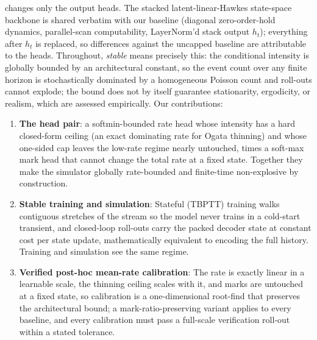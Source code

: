 \ssppp{} changes only the output heads. The stacked latent-linear-Hawkes
state-space backbone is shared verbatim with our \spppu{} baseline
(diagonal zero-order-hold dynamics, parallel-scan computability, LayerNorm'd
stack output $h_t$); everything after $h_t$ is replaced, so differences
against the uncapped baseline are attributable to the heads. Throughout,
\emph{stable} means precisely this: the conditional intensity is globally
bounded by an architectural constant, so the event count over any finite
horizon is stochastically dominated by a homogeneous Poisson count and
roll-outs cannot explode; the bound does not by itself guarantee
stationarity, ergodicity, or realism, which are assessed empirically. Our
contributions:
\begin{enumerate}
\item \textbf{The \ssppp{} head pair}: a softmin-bounded rate head whose
  intensity has a hard closed-form ceiling (an exact dominating rate for
  Ogata thinning) and whose one-sided cap leaves the low-rate regime nearly
  untouched, times a soft-max mark head that cannot change the total rate
  at a fixed state. Together they make the simulator globally rate-bounded
  and finite-time non-explosive by construction.
\item \textbf{Stable training and simulation}: Stateful (TBPTT) training
  walks contiguous stretches of the stream so the model never trains in a
  cold-start transient, and closed-loop roll-outs carry the packed decoder
  state at constant cost per state update, mathematically equivalent to
  encoding the full history. Training and simulation see the same regime.
\item \textbf{Verified post-hoc mean-rate calibration}: The rate is exactly
  linear in a learnable scale, the thinning ceiling scales with it, and
  marks are untouched at a fixed state, so calibration is a one-dimensional
  root-find that preserves the architectural bound; a mark-ratio-preserving
  variant applies to every baseline, and every calibration must pass a
  full-scale verification roll-out within a stated tolerance.
\end{enumerate}
